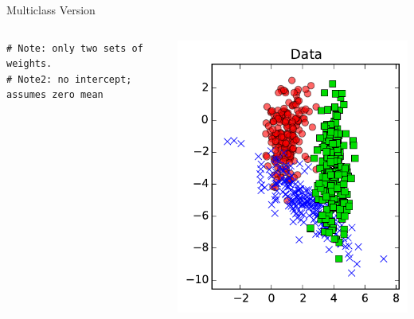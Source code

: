 \documentclass[10pt, aspectratio=169]{beamer} %
\begin{document}
\begin{frame}[fragile]{Multiclass Version }
\begin{columns}[onlytextwidth]
\begin{columns}[onlytextwidth]
\begin{lstlisting}
# Note: only two sets of weights.
# Note2: no intercept; assumes zero mean
\end{lstlisting}
\end{columns}
\vspace*{-1cm}
\begin{center}
	\includegraphics[width=\textwidth]{LR_3classes_data.pdf}\\

\end{center}
\end{columns}
\end{frame}
\end{document}
